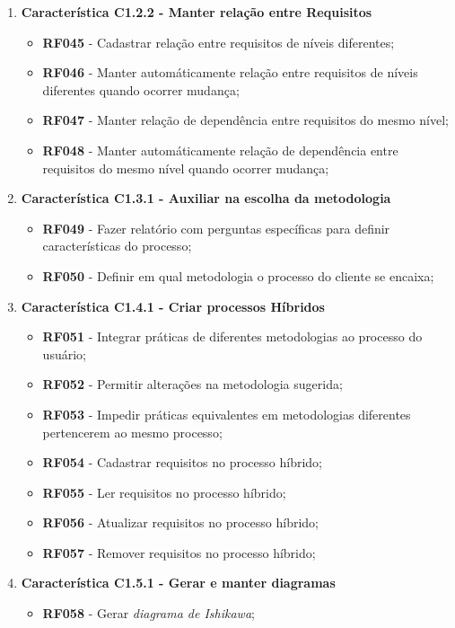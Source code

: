 \begin{enumerate}
\begin{itemize}
			\end{itemize}
		\item \textbf{Característica C1.2.2 - Manter relação entre Requisitos}
			\begin{itemize}
				\item \textbf{RF045} - Cadastrar relação entre requisitos de níveis diferentes;
				\item \textbf{RF046} - Manter automáticamente relação entre requisitos de níveis diferentes quando ocorrer mudança;
				\item \textbf{RF047} - Manter relação de dependência entre requisitos do mesmo nível;
				\item \textbf{RF048} - Manter automáticamente relação de dependência entre requisitos do mesmo nível quando ocorrer mudança;
			\end{itemize}
		\item \textbf{Característica C1.3.1 - Auxiliar na escolha da metodologia}
			\begin{itemize}
				\item \textbf{RF049} - Fazer relatório com perguntas específicas para definir características do processo;
				\item \textbf{RF050} - Definir em qual metodologia o processo do cliente se encaixa;
			\end{itemize}
		\item \textbf{Característica C1.4.1 - Criar processos Híbridos}
			\begin{itemize}
				\item \textbf{RF051} - Integrar práticas de diferentes metodologias ao processo do usuário;
				\item \textbf{RF052} - Permitir alterações na metodologia sugerida;
				\item \textbf{RF053} - Impedir práticas equivalentes em metodologias diferentes pertencerem ao mesmo processo;
				\item \textbf{RF054} - Cadastrar requisitos no processo híbrido;
				\item \textbf{RF055} - Ler requisitos no processo híbrido;
				\item \textbf{RF056} - Atualizar requisitos no processo híbrido;
				\item \textbf{RF057} - Remover requisitos no processo híbrido;
			\end{itemize}
		\item \textbf{Característica C1.5.1 - Gerar e manter diagramas}
			\begin{itemize}
				\item \textbf{RF058} - Gerar \textit{diagrama de Ishikawa};

\end{itemize}
\end{enumerate}

